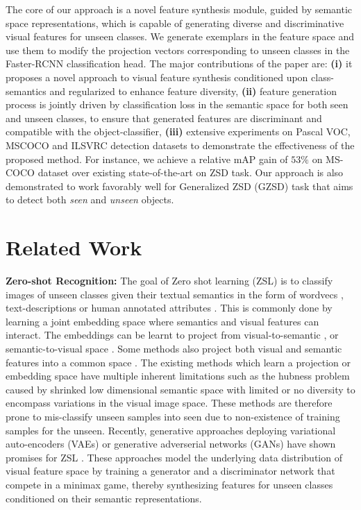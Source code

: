 \documentclass[runningheads]{llncs}
\begin{document}
The core of our approach is a novel feature synthesis module, guided by semantic space representations, which is capable of generating diverse and discriminative visual features for unseen classes. 
We generate exemplars in the feature space and use them to modify the projection vectors corresponding to unseen classes in the Faster-RCNN classification head. The major contributions of the paper are: \textbf{(i)} it proposes a novel approach to visual feature synthesis conditioned upon class-semantics and regularized to enhance feature diversity, \textbf{(ii)} feature generation process is jointly driven by classification loss in the semantic space for both seen and unseen classes, to ensure that generated features are discriminant and compatible with the object-classifier, \textbf{(iii)} extensive experiments on Pascal VOC, MSCOCO and ILSVRC detection datasets to demonstrate the effectiveness of the proposed method. For instance, we achieve a relative mAP gain of $53\%$ on MS-COCO dataset over existing state-of-the-art on ZSD task. Our approach is also demonstrated to work favorably well for Generalized ZSD (GZSD) task that aims to detect both \emph{seen} and \emph{unseen} objects. 


\section{Related Work}
\noindent\textbf{Zero-shot Recognition:}
The goal of Zero shot learning (ZSL) is to classify images of unseen classes given their textual semantics in the form of wordvecs \cite{zhang2017learning}, text-descriptions \cite{lei2015predicting,li2019zero} or human annotated attributes \cite{annadani2018preserving}. This is commonly done by learning a joint embedding space where semantics and visual features can interact. The embeddings can be learnt to project from visual-to-semantic \cite{lampert2013attribute}, or semantic-to-visual space \cite{zhang2017learning}. Some methods also project both visual and semantic features into a common space \cite{akata2015evaluation}. The existing methods which learn a projection or embedding space have multiple inherent limitations such as the hubness problem \cite{dinu2014improving} caused by shrinked low dimensional semantic space with limited or no diversity to encompass variations in the visual image space. These methods are therefore prone to mis-classify unseen samples into seen due to non-existence of training samples for the unseen. 
Recently, generative approaches deploying variational auto-encoders (VAEs) or generative adverserial networks (GANs) have shown promises for ZSL \cite{chen2018zero,xian2018feature,zhu2018generative,khan2018adversarial}. These approaches model the underlying data distribution of visual feature space by training a generator and a discriminator network that compete in a minimax game, thereby synthesizing features for unseen classes conditioned on their semantic representations. 
 
\end{document}
